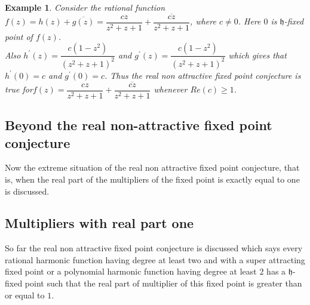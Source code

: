 \documentclass[a4paper,12pt,reqno]{amsart}
\newtheorem{example}{Example}
\begin{document}
\begin{example}\cite{The real non-attractive fixed point conjecture and beyond} Consider the rational function $f(z)=h(z)+\overline{g(z)}=\dfrac{cz}{z^{2}+z+1}+\overline{\dfrac{cz}{z^{2}+z+1}}$, where $c\neq 0$. Here $0$ is $\mathfrak{h}$-fixed point of $f(z)$.\\
 Also $h^{\prime}(z)=\dfrac{c(1-z^{2})}{(z^2+z+1)^2}$ and $g^{\prime}(z)=\dfrac{c(1-z^{2})}{(z^2+z+1)^2}$  which gives that $h^{\prime}(0)=c$ and $g^{\prime}(0)=c$. Thus the real non attractive fixed point conjecture is true for$f(z)=\dfrac{cz}{z^{2}+z+1}+\overline{\dfrac{cz}{z^{2}+z+1}}$ whenever $Re(c)\geq 1$.
 
 
 
  \end{example}

 \subsection{Beyond the real non-attractive fixed point conjecture}
Now the extreme situation of the real non attractive fixed point conjecture, that is, when the real part of the multipliers of the fixed point is exactly equal to one is discussed.
\subsection*{Multipliers with real part one}
So far the real non attractive fixed point conjecture is discussed which says every rational harmonic function having degree at least two and with a super attracting fixed point or a polynomial harmonic function having degree at least $2$ has a $\mathfrak{h}$-fixed point such that the real part of multiplier of this fixed point is greater than or equal to $1$.
\end{document}
